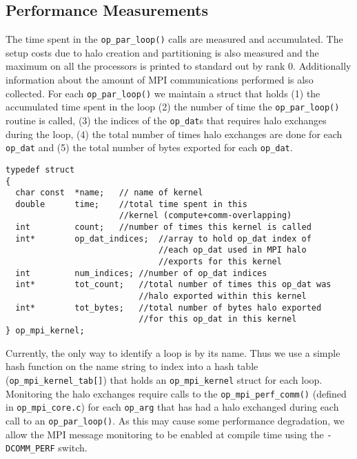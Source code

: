\documentclass[12pt]{article}
\begin{document}
\subsection{Performance Measurements}\label{subsec/perf}
The time spent in the \texttt{op\_par\_loop()} calls are measured and accumulated. The setup costs due to halo creation
and partitioning is also measured and the maximum on all the processors is printed to standard out by rank 0.
Additionally information about the amount of MPI communications performed is also collected. For each
\texttt{op\_par\_loop()} we maintain a struct that holds (1) the accumulated time spent in the loop (2) the number of
time the \texttt{op\_par\_loop()} routine is called, (3) the indices of the \texttt{op\_dat}s that requires halo
exchanges during the loop, (4) the total number of times halo exchanges are done for each \texttt{op\_dat} and (5)
the total number of bytes exported for each \texttt{op\_dat}. 
\begin{verbatim}
typedef struct 
{
  char const  *name;   // name of kernel 
  double      time;    //total time spent in this 
                       //kernel (compute+comm-overlapping)
  int         count;   //number of times this kernel is called
  int*        op_dat_indices;  //array to hold op_dat index of 
                               //each op_dat used in MPI halo 
                               //exports for this kernel
  int         num_indices; //number of op_dat indices
  int*        tot_count;   //total number of times this op_dat was 
                           //halo exported within this kernel
  int*        tot_bytes;   //total number of bytes halo exported 
                           //for this op_dat in this kernel  
} op_mpi_kernel;
\end{verbatim}
\noindent Currently, the only way to identify a loop is by its name. Thus we use a simple hash function on the
name string to index into a hash table (\texttt{op\_mpi\_kernel\_tab[]}) that holds an \texttt{op\_mpi\_kernel} struct
for each loop. Monitoring the halo exchanges require calls to the \texttt{op\_mpi\_perf\_comm()} (defined in
\texttt{op\_mpi\_core.c}) for each \texttt{op\_arg} that has had a halo exchanged during each call to an
\texttt{op\_par\_loop()}. As this may cause some performance degradation, we allow the MPI message monitoring to be
enabled at compile time using the \texttt{-DCOMM\_PERF} switch. 



\end{document}
